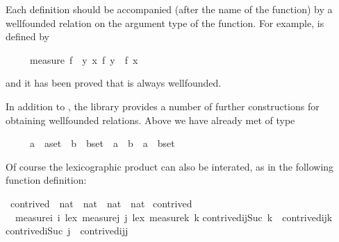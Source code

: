 \begin{isabellebody}
\begin{isamarkuptext}
Each  definition should be accompanied (after the
name of the function) by a wellfounded relation on the argument type
of the function. For example,  is defined by
\begin{isabelle}%
\ \ \ \ \ measure\ f\ {\isasymequiv}\ {\isacharbraceleft}{\isacharparenleft}y{\isacharcomma}\ x{\isacharparenright}{\isachardot}\ f\ y\ {\isacharless}\ f\ x{\isacharbraceright}%
\end{isabelle}
and it has been proved that  is always wellfounded.

In addition to , the library provides
a number of further constructions for obtaining wellfounded relations.
Above we have already met  of type
\begin{isabelle}%
\ \ \ \ \ {\isachardoublequote}{\isacharparenleft}{\isacharprime}a\ {\isasymtimes}\ {\isacharprime}a{\isacharparenright}set\ {\isasymRightarrow}\ {\isacharparenleft}{\isacharprime}b\ {\isasymtimes}\ {\isacharprime}b{\isacharparenright}set\ {\isasymRightarrow}\ {\isacharparenleft}{\isacharparenleft}{\isacharprime}a\ {\isasymtimes}\ {\isacharprime}b{\isacharparenright}\ {\isasymtimes}\ {\isacharparenleft}{\isacharprime}a\ {\isasymtimes}\ {\isacharprime}b{\isacharparenright}{\isacharparenright}set{\isachardoublequote}%
\end{isabelle}
Of course the lexicographic product can also be interated, as in the following
function definition:%
\end{isamarkuptext}%
\ contrived\ {\isacharcolon}{\isacharcolon}\ {\isachardoublequote}nat\ {\isasymtimes}\ nat\ {\isasymtimes}\ nat\ {\isasymRightarrow}\ nat{\isachardoublequote}\isanewline
{}\ contrived\isanewline
\ \ {\isachardoublequote}measure{\isacharparenleft}{\isasymlambda}i{\isachardot}\ i{\isacharparenright}\ {\isacharless}{\isacharasterisk}lex{\isacharasterisk}{\isachargreater}\ measure{\isacharparenleft}{\isasymlambda}j{\isachardot}\ j{\isacharparenright}\ {\isacharless}{\isacharasterisk}lex{\isacharasterisk}{\isachargreater}\ measure{\isacharparenleft}{\isasymlambda}k{\isachardot}\ k{\isacharparenright}{\isachardoublequote}\isanewline
{\isachardoublequote}contrived{\isacharparenleft}i{\isacharcomma}j{\isacharcomma}Suc\ k{\isacharparenright}\ {\isacharequal}\ contrived{\isacharparenleft}i{\isacharcomma}j{\isacharcomma}k{\isacharparenright}{\isachardoublequote}\isanewline
{\isachardoublequote}contrived{\isacharparenleft}i{\isacharcomma}Suc\ j{\isacharcomma}{}{\isacharparenright}\ {\isacharequal}\ contrived{\isacharparenleft}i{\isacharcomma}j{\isacharcomma}j{\isacharparenright}{\isachardoublequote}\isanewline

\end{isabellebody}
